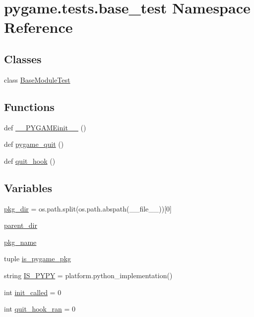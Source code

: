 \hypertarget{namespacepygame_1_1tests_1_1base__test}{}\section{pygame.\+tests.\+base\+\_\+test Namespace Reference}
\label{namespacepygame_1_1tests_1_1base__test}
\subsection*{Classes}
\begin{DoxyCompactItemize}
\item 
class \hyperlink{classpygame_1_1tests_1_1base__test_1_1_base_module_test}{Base\+Module\+Test}
\end{DoxyCompactItemize}
\subsection*{Functions}
\begin{DoxyCompactItemize}
\item 
def \hyperlink{namespacepygame_1_1tests_1_1base__test_ae7c81aa808ef0bac934c2209097a8836}{\+\_\+\+\_\+\+P\+Y\+G\+A\+M\+Einit\+\_\+\+\_\+} ()
\item 
def \hyperlink{namespacepygame_1_1tests_1_1base__test_aa5acd5ff88194c363b57120b8034c920}{pygame\+\_\+quit} ()
\item 
def \hyperlink{namespacepygame_1_1tests_1_1base__test_a8878dbb5bf27984cd2f6cce8c6002228}{quit\+\_\+hook} ()
\end{DoxyCompactItemize}
\subsection*{Variables}
\begin{DoxyCompactItemize}
\item 
\hyperlink{namespacepygame_1_1tests_1_1base__test_a98efaf10a7debec103c8a5944a7f2c15}{pkg\+\_\+dir} = os.\+path.\+split(os.\+path.\+abspath(\+\_\+\+\_\+file\+\_\+\+\_\+))\mbox{[}0\mbox{]}
\item 
\hyperlink{namespacepygame_1_1tests_1_1base__test_aabcdf94ad45984e5e130339742c17389}{parent\+\_\+dir}
\item 
\hyperlink{namespacepygame_1_1tests_1_1base__test_a642fbee1516dc69f94dd8370e33e7c1b}{pkg\+\_\+name}
\item 
tuple \hyperlink{namespacepygame_1_1tests_1_1base__test_acfdea96ce1ede34f3550ad0a0ad26ea8}{is\+\_\+pygame\+\_\+pkg}
\item 
string \hyperlink{namespacepygame_1_1tests_1_1base__test_aee9af92dfe88370141eff1e64623cb09}{I\+S\+\_\+\+P\+Y\+PY} = platform.\+python\+\_\+implementation()
\item 
int \hyperlink{namespacepygame_1_1tests_1_1base__test_a360cc7185b85bbe98a3fdf76f15c3527}{init\+\_\+called} = 0
\item 
int \hyperlink{namespacepygame_1_1tests_1_1base__test_a1fd8c282e6adead31d9b104ae52f83d6}{quit\+\_\+hook\+\_\+ran} = 0
\end{DoxyCompactItemize}


